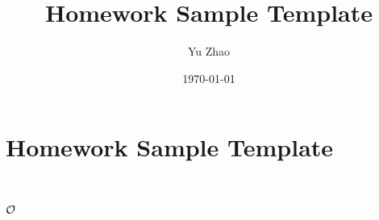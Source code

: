 \documentclass[11pt]{article}
\title{Homework Sample Template}
\author{Yu Zhao}
\date{\today}
\begin{document}
\maketitle

\setcounter{tocdepth}{3}
\tableofcontents
\vspace*{1cm}
\section{Homework Sample Template}
\label{sec-1}

  $\newcommand{\N}{\mathbb{N}}$
  $\newcommand{\Z}{\mathbb{Z}}$
  $\newcommand{\Q}{\mathbb{Q}}$
  $\newcommand{\R}{\mathbb{R}}$
  $\newcommand{\C}{\mathbb{C}}$
  $\renewcommand{\O}{\mathcal{O}}$ 
  
  
$\O$
\end{document}
